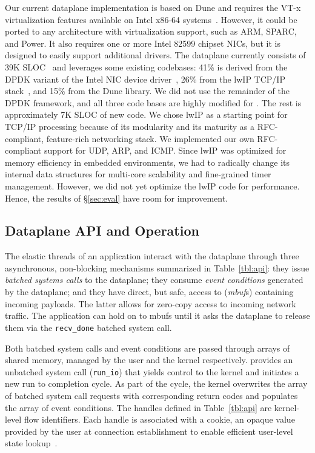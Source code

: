 Our current \ix dataplane implementation is based on Dune and requires
the VT-x virtualization features available on Intel x86-64
systems~\cite{DBLP:journals/computer/UhligNRSMABKLS05}. However, it
could be ported to any architecture with virtualization support, such
as ARM, SPARC, and Power. It also requires one or more Intel 82599
chipset NICs, but it is designed to easily support additional drivers.
The \ix dataplane currently consists of 39K SLOC~\cite{url:sloccount}
and leverages some existing codebases: 41\% is derived from the DPDK
variant of the Intel NIC device driver~\cite{intel:dpdk}, 26\% from
the lwIP TCP/IP stack~\cite{dunkels2001design}, and 15\% from the Dune
library.  We did not use the remainder of the DPDK framework, and all three code
bases are highly modified for \ix. The rest is approximately 7K SLOC
of new code. We chose lwIP as a starting point for TCP/IP processing
because of its modularity and its maturity as a RFC-compliant,
feature-rich networking stack. We implemented our own RFC-compliant
support for UDP, ARP, and ICMP.  Since lwIP was optimized for memory
efficiency in embedded environments, we had to radically change its
internal data structures for multi-core scalability and fine-grained
timer management. However, we did not yet optimize the lwIP code for
performance. Hence, the results of \S\ref{sec:eval} have room for
improvement.


\subsection{Dataplane API and Operation}
\label{sec:impl:api}

The elastic threads of an application interact with the \ix dataplane through three
asynchronous, non-blocking mechanisms summarized in
Table~\ref{tbl:api}: they issue \emph{batched systems calls} to the
dataplane; they consume \emph{event conditions} generated by the
dataplane; and they have direct, but safe, access to (\emph{mbuf}s)
containing incoming payloads.  The latter allows for zero-copy access
to incoming network traffic.  The application can hold on to mbufs
until it asks the dataplane to release them via the
\texttt{recv\_done} batched system call.

Both batched system calls and event conditions are passed through
arrays of shared memory, managed by the user and the kernel
respectively.  \ix provides an unbatched system call
(\texttt{run\_io}) that yields control to the kernel and initiates a
new run to completion cycle. As part of the cycle, the kernel
overwrites the array of batched system call requests with
corresponding return codes and populates the array of event
conditions.  The handles defined in Table~\ref{tbl:api} are
kernel-level flow identifiers. Each handle is associated with a
cookie, an opaque value provided by the user at connection
establishment to enable efficient user-level state
lookup~\cite{DBLP:conf/osdi/HanMCR12}. %

